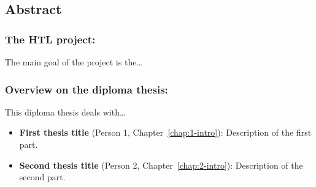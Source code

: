 \begin{flushleft}

	\subsection*{Abstract}

		\subsubsection*{The HTL project:}

		The main goal of the project is the\dots

		\subsubsection*{Overview on the diploma thesis:}

		This diploma thesis deals with\dots

		\begin{itemize}
			\item \textbf{First thesis title} (Person 1, Chapter~\ref{chap:1-intro}): Description of the first part.
			
			\item \textbf{Second thesis title} (Person 2, Chapter~\ref{chap:2-intro}): Description of the second part.
		\end{itemize}
\end{flushleft}